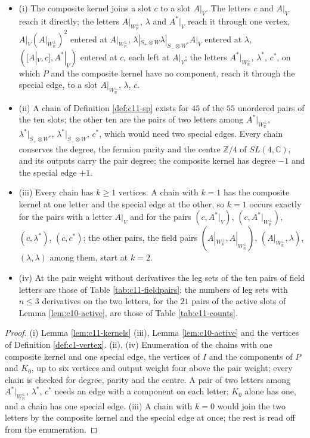 \begin{proposition}
\label{prop:c11-census}
\begin{itemize}
\item (i) The composite kernel joins a slot $c$ to a slot $A|_V$. The letters $c$ and $A|_V$ reach it directly; the letters $A|_{W_{\mathbb R}^\perp}$, $\lambda$ and $A^*|_V$ reach it through one vertex, $A|_V(A|_{W_{\mathbb R}^\perp})^2$ entered at $A|_{W_{\mathbb R}^\perp}$, $\lambda|_{S_+\otimes W}\lambda|_{S_-\otimes W^*}A|_V$ entered at $\lambda$, $([A|_V,c],A^*|_V)$ entered at $c$, each left at $A|_V$; the letters $A^*|_{W_{\mathbb R}^\perp}$, $\lambda^*$, $c^*$, on which $P$ and the composite kernel have no component, reach it through the special edge, to a slot $A|_{W_{\mathbb R}^\perp}$, $\lambda$, $c$.
\item (ii) A chain of Definition \ref{def:c11-sp} exists for $45$ of the $55$ unordered pairs of the ten slots; the other ten are the pairs of two letters among $A^*|_{W_{\mathbb R}^\perp}$, $\lambda^*|_{S_+\otimes W^*}$, $\lambda^*|_{S_-\otimes W}$, $c^*$, which would need two special edges. Every chain conserves the degree, the fermion parity and the centre $\mathbb Z/4$ of $SL(4,\mathbb C)$, and its outputs carry the pair degree; the composite kernel has degree $-1$ and the special edge $+1$.
\item (iii) Every chain has $k\ge1$ vertices. A chain with $k=1$ has the composite kernel at one letter and the special edge at the other, so $k=1$ occurs exactly for the pairs with a letter $A|_V$ and for the pairs $(c,A^*|_V)$, $(c,A^*|_{W_{\mathbb R}^\perp})$, $(c,\lambda^*)$, $(c,c^*)$; the other pairs, the field pairs $(A|_{W_{\mathbb R}^\perp},A|_{W_{\mathbb R}^\perp})$, $(A|_{W_{\mathbb R}^\perp},\lambda)$, $(\lambda,\lambda)$ among them, start at $k=2$.
\item (iv) At the pair weight without derivatives the leg sets of the ten pairs of field letters are those of Table \ref{tab:c11-fieldpairs}; the numbers of leg sets with $n\le3$ derivatives on the two letters, for the $21$ pairs of the active slots of Lemma \ref{lem:c10-active}, are those of Table \ref{tab:c11-counts}.
\end{itemize}
\end{proposition}

\begin{proof}
(i) Lemma \ref{lem:c11-kernels} (iii), Lemma \ref{lem:c10-active} and the vertices of Definition \ref{def:c1-vertex}. (ii), (iv) Enumeration of the chains with one composite kernel and one special edge, the vertices of $I$ and the components of $P$ and $K_0$, up to six vertices and output weight four above the pair weight; every chain is checked for degree, parity and the centre. A pair of two letters among $A^*|_{W_{\mathbb R}^\perp}$, $\lambda^*$, $c^*$ needs an edge with a component on each letter; $K_0$ alone has one, and a chain has one special edge. (iii) A chain with $k=0$ would join the two letters by the composite kernel and the special edge at once; the rest is read off from the enumeration.
\end{proof}

